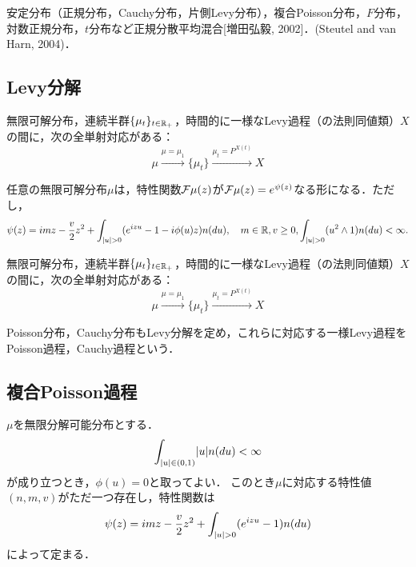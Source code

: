 \documentclass[uplatex,dvipdfmx]{jsreport}
\begin{document}
\begin{example}
    安定分布（正規分布，Cauchy分布，片側Levy分布），複合Poisson分布，$F$分布，対数正規分布，$t$分布など正規分散平均混合[増田弘毅, 2002]．(Steutel and van Harn, 2004)．
\end{example}

\subsection{Levy分解}

\begin{tcolorbox}[colframe=ForestGreen, colback=ForestGreen!10!white,breakable,colbacktitle=ForestGreen!40!white,coltitle=black,fonttitle=\bfseries\sffamily,
title=]
    無限可解分布，連続半群$\{\mu_t\}_{t\in\mathbb{R}_+}$，時間的に一様なLevy過程（の法則同値類）$X$の間に，次の全単射対応がある：
    \[\mu\xrightarrow{\mu=\mu_1}\{\mu_t\}\xrightarrow{\mu_t=P^{X(t)}}X\]
\end{tcolorbox}

\begin{theorem}[無限可解分布のLevy分解定理]
    任意の無限可解分布$\mu$は，特性関数$\mathcal{F}\mu(z)$が$\mathcal{F}\mu(z)=e^{\psi(z)}$なる形になる．ただし，
    \[\psi(z)=imz-\frac{v}{2}z^2+\int_{\lvert u\rvert>0}(e^{izu}-1-i\phi(u)z)n(du),\quad m\in\mathbb{R},v\ge0,\int_{\lvert u\rvert>0}(u^2\land 1)n(du)<\infty.\]
\end{theorem}

\begin{corollary}
    無限可解分布，連続半群$\{\mu_t\}_{t\in\mathbb{R}_+}$，時間的に一様なLevy過程（の法則同値類）$X$の間に，次の全単射対応がある：
    \[\mu\xrightarrow{\mu=\mu_1}\{\mu_t\}\xrightarrow{\mu_t=P^{X(t)}}X\]
\end{corollary}

\begin{example}
    Poisson分布，Cauchy分布もLevy分解を定め，これらに対応する一様Levy過程をPoisson過程，Cauchy過程という．
\end{example}

\subsection{複合Poisson過程}

\begin{discussion}
    $\mu$を無限分解可能分布とする．
    \[\int_{\lvert u\rvert\in(0,1)}\lvert u\rvert n(du)<\infty\]
    が成り立つとき，$\phi(u)=0$と取ってよい．
    このとき$\mu$に対応する特性値$(n,m,v)$がただ一つ存在し，特性関数は
    \[\psi(z)=imz-\frac{v}{2}z^2+\int_{\lvert u\rvert>0}(e^{izu}-1)n(du)\]
    によって定まる．
\end{discussion}
\end{document}
